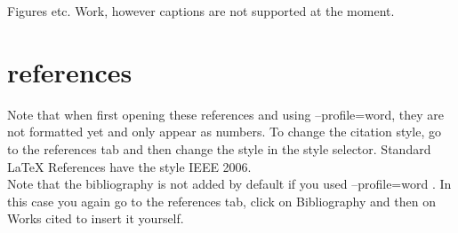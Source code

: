 \documentclass{article}
\begin{document}
Figures etc. Work, however captions are not supported at the moment. 
\section{references}
\cite{book1} \cite{book2} \cite{booklet1,incollection1}
Note that when first opening these references and using --profile=word, they are not formatted yet and only appear as numbers. To change the citation style, go to the references tab and then change the style in the style selector. Standard LaTeX References have the style IEEE 2006.  \\ 
Note that the bibliography is not added by default if you used --profile=word . In this case you again go to the references tab, click on Bibliography and then on Works cited to insert it yourself. 


\end{document}

